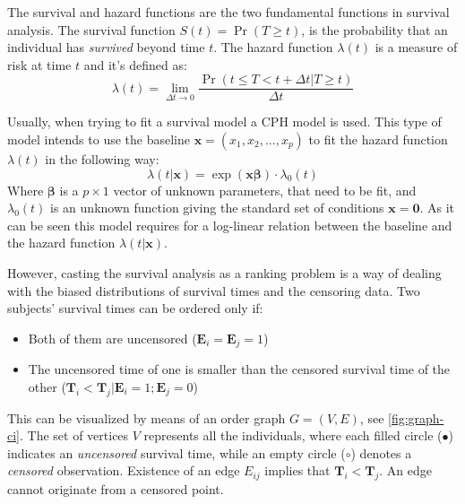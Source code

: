 The survival and hazard functions are the two fundamental functions in survival analysis. The
survival function \( S(t) = \Pr(T \ge t) \), is the probability that an individual has
\emph{survived} beyond time \( t \). The hazard function \( \lambda(t) \) is a measure of risk at 
time \( t \) and it's defined as:
~\cite{medical:cox}
\[
  \lambda(t) = \lim_{\Delta t \rightarrow 0}
  \frac{\Pr(t \le T < t + \Delta t | T \ge t)}{\Delta t}
\]

Usually, when trying to fit a survival model a \gls{CPH} model is used. This type of model
intends to use the \gls{baseline} \( \bm{x} = (x_1, x_2, ..., x_p) \)
to fit the hazard function \( \lambda(t) \)
in the following way:
\[
  \lambda(t | \bm{x}) = \exp(\bm{x}\bm{\beta}) \cdot \lambda_0 (t)
\]
Where \( \bm{\beta} \) is a \( p \times 1 \) vector of unknown parameters, that need to be fit, 
and \( \lambda_0(t) \) is an unknown function giving the standard set of conditions 
\( \bm{x} = \bm{0} \). As it can be seen this model requires for a log-linear relation between
the \gls{baseline}  and the hazard function \( \lambda(t | \bm{x}) \).

However, casting the survival analysis as a ranking problem is a way of dealing with the biased
distributions of survival times and the censoring data. Two subjects' survival times can be 
ordered only if:
\begin{itemize}
  \item Both of them are uncensored (\( \bm{E}_i = \bm{E}_j = 1\))
  \item The uncensored time of one is smaller than the censored survival time of the other
  (\( \bm{T}_i < \bm{T}_j | \bm{E}_i = 1; \bm{E}_j = 0 \))
\end{itemize}

This can be visualized by means of an order graph \( G = (V, E) \), see \autoref{fig:graph-ci}.
The set of vertices \( V \) represents all the individuals, where each filled circle 
(\( \bullet \)) indicates an \emph{uncensored} survival time, while an empty circle 
(\( \circ \)) denotes a \emph{censored} observation.
Existence of an edge \( E_{ij} \) implies that \( \bm{T}_i < \bm{T}_j \). An edge cannot originate 
from a censored point.

